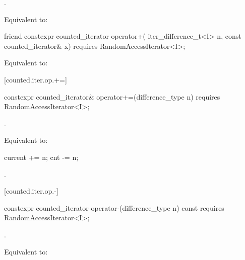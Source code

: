 \begin{addedblock}
\begin{itemdescr}
\pnum
\expects {}.

\pnum
\effects Equivalent to: 
\end{itemdescr}

%
%
\begin{itemdecl}
friend constexpr counted_iterator operator+(
  iter_difference_t<I> n, const counted_iterator& x)
    requires RandomAccessIterator<I>;
\end{itemdecl}

\begin{itemdescr}
\pnum
\effects Equivalent to: 
\end{itemdescr}

[counted.iter.op.+=]{}

%
%
\begin{itemdecl}
  constexpr counted_iterator& operator+=(difference_type n)
    requires RandomAccessIterator<I>;
\end{itemdecl}

\begin{itemdescr}
\pnum
\expects {}.

\pnum
\effects Equivalent to:
\begin{codeblock}
current += n;
cnt -= n;
\end{codeblock}

\pnum
\returns {}.
\end{itemdescr}

[counted.iter.op.-]{}

%
%
\begin{itemdecl}
  constexpr counted_iterator operator-(difference_type n) const
    requires RandomAccessIterator<I>;
\end{itemdecl}

\begin{itemdescr}
\pnum
\expects {}.

\pnum
\effects Equivalent to: 
\end{itemdescr}


\end{addedblock}
